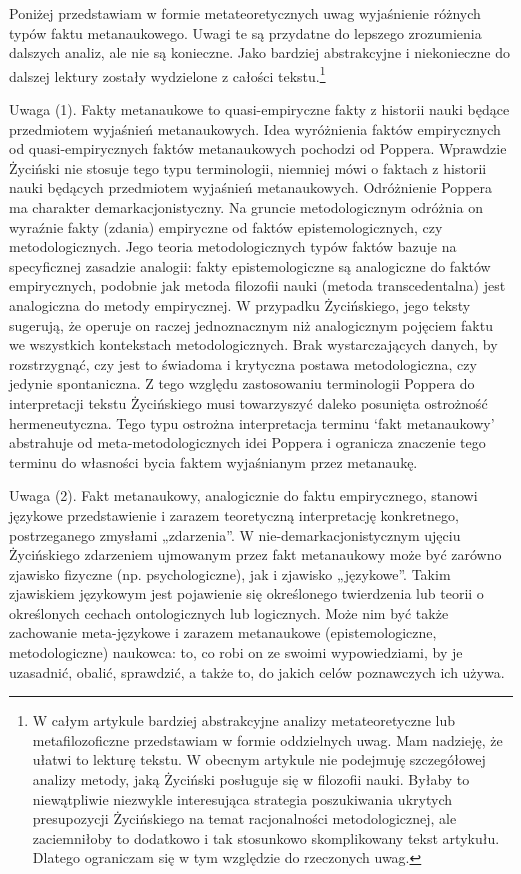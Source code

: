 \documentclass{article}
\begin{document}
Poniżej przedstawiam w formie metateoretycznych uwag wyjaśnienie różnych typów faktu metanaukowego. Uwagi te są
przydatne do lepszego zrozumienia dalszych analiz, ale nie są konieczne. Jako bardziej abstrakcyjne i niekonieczne do
dalszej lektury zostały wydzielone z całości tekstu.\footnote{W całym artykule bardziej abstrakcyjne analizy
metateoretyczne lub metafilozoficzne przedstawiam w formie oddzielnych uwag. Mam nadzieję, że ułatwi to lekturę tekstu.
W obecnym artykule nie podejmuję szczegółowej analizy metody, jaką Życiński posługuje się w filozofii nauki. Byłaby to
niewątpliwie niezwykle interesująca strategia poszukiwania ukrytych presupozycji Życińskiego na temat racjonalności
metodologicznej, ale zaciemniłoby to dodatkowo i tak stosunkowo skomplikowany tekst artykułu. Dlatego ograniczam się w
tym względzie do rzeczonych uwag.}

Uwaga (1). Fakty metanaukowe to quasi-empiryczne fakty z historii nauki będące przedmiotem wyjaśnień metanaukowych. Idea
wyróżnienia faktów empirycznych od quasi-empirycznych faktów metanaukowych pochodzi od Poppera. Wprawdzie Życiński nie
stosuje tego typu terminologii, niemniej mówi o faktach z historii nauki będących przedmiotem wyjaśnień metanaukowych.
Odróżnienie Poppera ma charakter demarkacjonistyczny. Na gruncie metodologicznym odróżnia on wyraźnie fakty (zdania)
empiryczne od faktów epistemologicznych, czy metodologicznych. Jego teoria metodologicznych typów faktów bazuje na
specyficznej zasadzie analogii: fakty epistemologiczne są analogiczne do faktów empirycznych, podobnie jak metoda
filozofii nauki (metoda transcedentalna) jest analogiczna do metody empirycznej. W przypadku Życińskiego, jego teksty
sugerują, że operuje on raczej jednoznacznym niż analogicznym pojęciem faktu we wszystkich kontekstach
metodologicznych. Brak wystarczających danych, by rozstrzygnąć, czy jest to świadoma i krytyczna postawa
metodologiczna, czy jedynie spontaniczna. Z tego względu zastosowaniu terminologii Poppera do interpretacji tekstu
Życińskiego musi towarzyszyć daleko posunięta ostrożność hermeneutyczna. Tego typu ostrożna interpretacja terminu ‘fakt
metanaukowy’ abstrahuje od meta-metodologicznych idei Poppera i ogranicza znaczenie tego terminu do własności bycia
faktem wyjaśnianym przez metanaukę.

Uwaga (2). Fakt metanaukowy, analogicznie do faktu empirycznego, stanowi językowe przedstawienie i zarazem teoretyczną
interpretację konkretnego, postrzeganego zmysłami „zdarzenia”. W nie-demarkacjonistycznym ujęciu Życińskiego zdarzeniem
ujmowanym przez fakt metanaukowy może być zarówno zjawisko fizyczne (np. psychologiczne), jak i zjawisko „językowe”.
Takim zjawiskiem językowym jest pojawienie się określonego twierdzenia lub teorii o określonych cechach ontologicznych
lub logicznych. Może nim być także zachowanie meta-językowe i zarazem metanaukowe (epistemologiczne, metodologiczne)
naukowca: to, co robi on ze swoimi wypowiedziami, by je uzasadnić, obalić, sprawdzić, a także to, do jakich celów
poznawczych ich używa.
\end{document}
